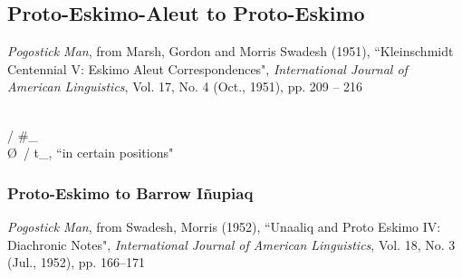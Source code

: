 \documentclass[11pt]{article}
\newcommand{\ipa}{\textipa}
\begin{document}
\subsection{Proto-Eskimo-Aleut to Proto-Eskimo}{\it Pogostick Man}, from Marsh, Gordon and Morris Swadesh (1951), \textquotedblleft Kleinschmidt Centennial V: Eskimo Aleut Correspondences", \textit{International Journal of American Linguistics}, Vol. 17, No. 4 (Oct., 1951), pp. 209 -- 216

 \textrightarrow\hspace{0pt} \ipa{t s} \\
 \textrightarrow\hspace{0pt} \ipa{k q} / \#_ \\
 \textrightarrow\hspace{0pt} \O\ / t_, \textquotedblleft in certain positions"

\subsubsection{Proto-Eskimo to Barrow I\~{n}upiaq}{\it Pogostick Man}, from Swadesh, Morris (1952), \textquotedblleft Unaaliq and Proto Eskimo IV: Diachronic Notes", \textit{International Journal of American Linguistics}, Vol. 18, No. 3 (Jul., 1952), pp. 166--171
\end{document}

